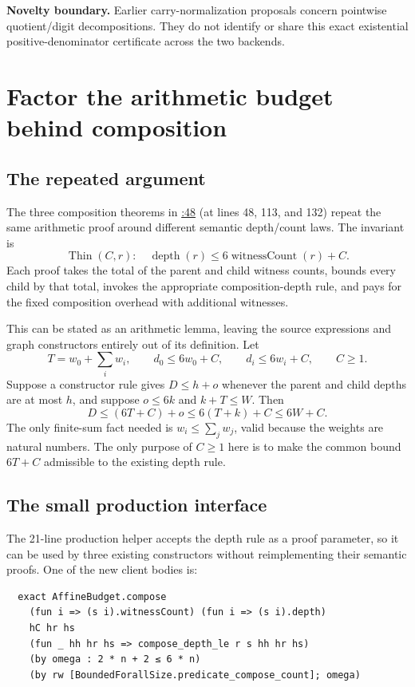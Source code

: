 \documentclass[11pt,letterpaper]{article}
\newcommand{\code}[1]{\texttt{\detokenize{#1}}}
\newcommand{\src}[2]{\href{https://github.com/VladimirReshetnikov/ProveIt/blob/6175dff9a15491497c7a3c1bda4f6a62a6349c74/Computability/DiophantineConsistency/Lean/DiophantineConsistency/#1.lean\#L#2}{\code{#1.lean}:#2}}
\begin{document}
\textbf{Novelty boundary.} Earlier carry-normalization proposals concern
pointwise quotient/digit decompositions. They do not identify or share this
exact existential positive-denominator certificate across the two backends.

\section{Factor the arithmetic budget behind composition}

\subsection{The repeated argument}

The three composition theorems in \src{GraphSizeBounds}{48}
(at lines 48, 113, and 132) repeat the same
arithmetic proof around different semantic depth/count laws. The invariant is
\[
 \operatorname{Thin}(C,r):\quad
 \operatorname{depth}(r)\le 6\operatorname{witnessCount}(r)+C.
\]
Each proof takes the total of the parent and child witness counts, bounds
every child by that total, invokes the appropriate composition-depth rule,
and pays for the fixed composition overhead with additional witnesses.

This can be stated as an arithmetic lemma, leaving the source expressions
and graph constructors entirely out of its definition. Let
\[
 T=w_0+\sum_iw_i,
 \qquad d_0\le6w_0+C,
 \qquad d_i\le6w_i+C,
 \qquad C\ge1.
\]
Suppose a constructor rule gives \(D\le h+o\) whenever the parent and child
depths are at most \(h\), and suppose
\(o\le6k\) and \(k+T\le W\). Then
\[
 D\le (6T+C)+o\le6(T+k)+C\le6W+C.
\]
The only finite-sum fact needed is \(w_i\le\sum_jw_j\), valid because the
weights are natural numbers. The only purpose of \(C\ge1\) here is to
make the common bound \(6T+C\) admissible to the existing depth rule.

\subsection{The small production interface}

The 21-line production helper accepts the depth rule as a proof parameter,
so it can be used by three existing constructors without reimplementing
their semantic proofs. One of the new client bodies is:

\begin{Verbatim}
  exact AffineBudget.compose
    (fun i => (s i).witnessCount) (fun i => (s i).depth)
    hC hr hs
    (fun _ hh hr hs => compose_depth_le r s hh hr hs)
    (by omega : 2 * n + 2 ≤ 6 * n)
    (by rw [BoundedForallSize.predicate_compose_count]; omega)
\end{Verbatim}
\end{document}

